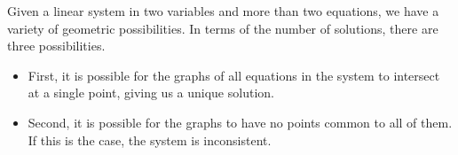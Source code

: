 \documentclass{ximera}
\begin{document}
\begin{exploration}
\begin{itemize}
\begin{center}
          \end{center}
          \end{itemize}
      
                  Given a linear system in two variables and more than two equations, we have a variety of geometric possibilities.  In terms of the number of solutions, there are three possibilities.
       
                  \begin{itemize}
                  \item First, it is possible for the graphs of all equations in the system to intersect at a single point, giving us a unique solution. 
                   
                  \begin{center}
                  \end{center}
                   
                  \item Second, it is possible for the graphs to have no points common to all of them.  If this is the case, the system is inconsistent.
                   
                  \begin{center}
\end{center}
\end{itemize}
\end{exploration}
\end{document}
